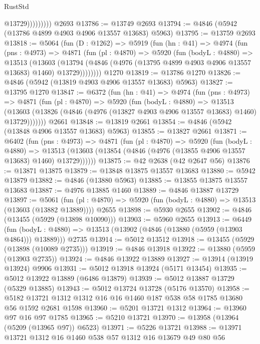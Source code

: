 \begin{lexlean}{RustStd}
\begin{coremodule}
                      @13729)))))))))
    @2693
@13786 := @13749 @2693
@13794 := @4846 (@5942 (@13786 @4899 @4903 @4906 @13557 @13683) @5963)
@13795 := @13759 @2693
@13818 := @5064
    (fun (D : @1262) =>
    @5919
      (fun (hn : @41) =>
      @4974
        (fun (pns : @4973) =>
        @4871
          (fun (pl : @4870) =>
          @5920
            (fun (bodyL : @4880) =>
            @13513
              (@13603
                (@13794 (@4846 (@4976 (@13795 @4899 @4903 @4906 @13557 @13683) @1460) @13729))))))))
    @1270
@13819 := @13786 @1270
@13826 := @4846 (@5942 (@13819 @4903 @4906 @13557 @13683) @5963)
@13827 := @13795 @1270
@13847 := @6372
    (fun (hn : @41) =>
    @4974
      (fun (pns : @4973) =>
      @4871
        (fun (pl : @4870) =>
        @5920
          (fun (bodyL : @4880) =>
          @13513
            (@13603 (@13826 (@4846 (@4976 (@13827 @4903 @4906 @13557 @13683) @1460) @13729)))))))
    @2661
@13848 := @13819 @2661
@13854 := @4846 (@5942 (@13848 @4906 @13557 @13683) @5963)
@13855 := @13827 @2661
@13871 := @6402
    (fun (pns : @4973) =>
    @4871
      (fun (pl : @4870) =>
      @5920
        (fun (bodyL : @4880) =>
        @13513 (@13603 (@13854 (@4846 (@4976 (@13855 @4906 @13557 @13683) @1460) @13729))))))
@13875 := @42 @2638 (@42 @2647 @56)
@13876 := @13871 @13875
@13879 := @13848 @13875 @13557 @13683
@13880 := @5942 @13879
@13882 := @4846 (@13880 @5963)
@13885 := @13855 @13875 @13557 @13683
@13887 := @4976 @13885 @1460
@13889 := @4846 @13887 @13729
@13897 := @5061
    (fun (pl : @4870) => @5920 (fun (bodyL : @4880) => @13513 (@13603 (@13882 @13889))))
    @2655
@13898 := @5930 @2655
@13902 := @4846 (@13455 (@5929 (@13898 @10090)))
@13903 := @5960 @2655
@13913 := @6449
    (fun (bodyL : @4880) => @13513 (@13902 (@4846 (@13880 (@5959 (@13903 @4864))) @13889)))
    @2735
@13914 := @5012 @13512
@13918 := @13455 (@5929 (@13898 (@10089 @2735)))
@13919 := @4846 @13918
@13922 := @13880 (@5959 (@13903 @2735))
@13924 := @4846 @13922 @13889
@13927 := @13914 (@13919 @13924) @9906
@13931 := @5012 @13918 @13924 (@5171 @13454)
@13935 := @5012 @13922 @13889 (@6486 @13879)
@13939 := @5012 @13887 @13729 (@5329 @13885)
@13943 := @5012 @13724 @13728 (@5176 @13570)
@13958 := @5182 @13721 @1312 @1312 @16 @16 @1460 @187 @538 @58 @1785 @13680 @56 @1592 @2681 @1598
@13960 := @5201 @13721 @1312
@13964 := @13960 @97 @16 @97 @1785
@13965 := @5210 @13721
@13970 := @13958 (@13964 (@5209 (@13965 @97)) @6523)
@13971 := @5226 @13721
@13988 := @13971
    @13721
    @1312
    @16
    @1460
    @538
    @57
    @1312
    @16
    @13679
    @49
    @80
    @56

\end{coremodule}
\end{lexlean}
